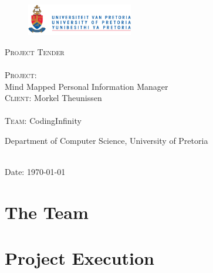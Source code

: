 \documentclass[12pt]{article}
\begin{document}
\begin{titlepage}
	\begin{center}
		
		\begin{figure}[t]
			\centering
			\includegraphics[width=175px]{UP_Logo.png}
		\end{figure}
		
		\textsc{\Huge Project Tender} \\ 

		\textsc{\huge \\Project:\\	}
		\huge Mind Mapped Personal Information Manager
		\textsc{\Large \\Client:}
		\large Morkel Theunissen\\
		\textsc{\huge \\Team:}
		\huge \textsc{}CodingInfinity\textsc{}
		
		\small Department of Computer Science, University of Pretoria \\
		\hfill \\

	\vfill

	{\large Date: \today}		
		
		
	\end{center}
\end{titlepage}

\pagebreak
\tableofcontents

\pagebreak

\section{The Team}

\pagebreak
\section{Project Execution}

\end{document}
